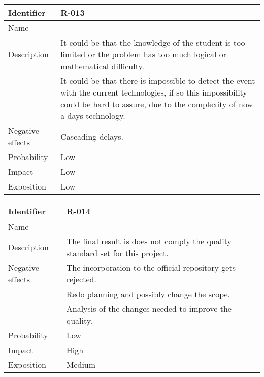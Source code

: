 \begin{table}[H]
	\begin{tabularx}{\textwidth}{|l|X|}
		\hline
		\rowcolor{gray!30}
		Identifier & \textbf{R-013} \\ \hline
		Name & \Rtrece \\ \hline
		Description
			& It could be that the knowledge of the student is too limited or the problem has too much logical or mathematical difficulty.\\
			& It could be that there is impossible to detect the event with the current technologies, if so this impossibility could be hard to assure, due to the complexity of now a days technology.\\ \hline
		Negative effects
			& Cascading delays. \\ \hline
		Probability & Low\\ \hline
		Impact &  Low\\ \hline
		Exposition &  Low\\ \hline
	\end{tabularx}
\end{table}

\begin{table}[H]
	\begin{tabularx}{\textwidth}{|l|X|}
		\hline
		\rowcolor{gray!30}
		Identifier & \textbf{R-014} \\ \hline
		Name & \Rcatorce \\ \hline
		Description
			& The final result is does not comply the quality standard set for this project. \\ \hline
		Negative effects
			& The incorporation to the official repository gets rejected.\\
			& Redo planning and possibly change the scope.  \\
			& Analysis of the changes needed to improve the quality. \\ \hline
		Probability & Low\\ \hline
		Impact &  High\\ \hline
		Exposition &  Medium\\ \hline
	\end{tabularx}
\end{table}

